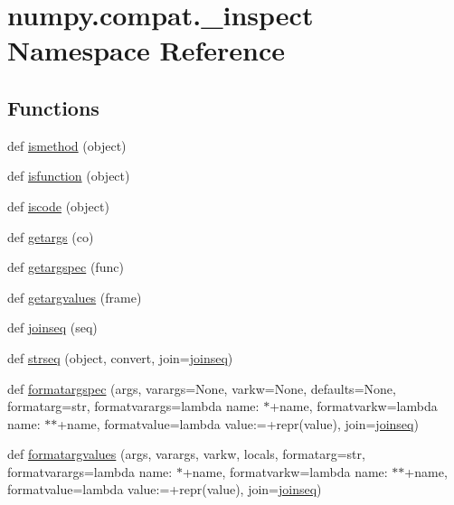 \hypertarget{namespacenumpy_1_1compat_1_1__inspect}{}\section{numpy.\+compat.\+\_\+inspect Namespace Reference}
\label{namespacenumpy_1_1compat_1_1__inspect}
\subsection*{Functions}
\begin{DoxyCompactItemize}
\item 
def \hyperlink{namespacenumpy_1_1compat_1_1__inspect_ae59647a7593534301b0ce285e6d7eaf6}{ismethod} (object)
\item 
def \hyperlink{namespacenumpy_1_1compat_1_1__inspect_a669c0eb73402e8093553b02da2044fed}{isfunction} (object)
\item 
def \hyperlink{namespacenumpy_1_1compat_1_1__inspect_a71a2fe78ad81c44cd5ecafd51045568c}{iscode} (object)
\item 
def \hyperlink{namespacenumpy_1_1compat_1_1__inspect_a23817c2f9b36917251659f54ae73dd93}{getargs} (co)
\item 
def \hyperlink{namespacenumpy_1_1compat_1_1__inspect_a15898a9bd81ac934993fdb5799f07f0b}{getargspec} (func)
\item 
def \hyperlink{namespacenumpy_1_1compat_1_1__inspect_a9a4cbd507be7b8c8d5f12d4d21a9defb}{getargvalues} (frame)
\item 
def \hyperlink{namespacenumpy_1_1compat_1_1__inspect_ab1438af7fbbffb0fd2b5a564cdd7eef8}{joinseq} (seq)
\item 
def \hyperlink{namespacenumpy_1_1compat_1_1__inspect_a7313bf47b85e2438ff6882685a66ae5f}{strseq} (object, convert, join=\hyperlink{namespacenumpy_1_1compat_1_1__inspect_ab1438af7fbbffb0fd2b5a564cdd7eef8}{joinseq})
\item 
def \hyperlink{namespacenumpy_1_1compat_1_1__inspect_a67dec5118cf81371090560691d8f4fc4}{formatargspec} (args, varargs=None, varkw=None, defaults=None, formatarg=str, formatvarargs=lambda name\+:\textquotesingle{} $\ast$\textquotesingle{}+name, formatvarkw=lambda name\+:\textquotesingle{} $\ast$$\ast$\textquotesingle{}+name, formatvalue=lambda value\+:\textquotesingle{}=\textquotesingle{}+repr(value), join=\hyperlink{namespacenumpy_1_1compat_1_1__inspect_ab1438af7fbbffb0fd2b5a564cdd7eef8}{joinseq})
\item 
def \hyperlink{namespacenumpy_1_1compat_1_1__inspect_af63fc3a833eff7c78a4b80b071c5cd2b}{formatargvalues} (args, varargs, varkw, locals, formatarg=str, formatvarargs=lambda name\+:\textquotesingle{} $\ast$\textquotesingle{}+name, formatvarkw=lambda name\+:\textquotesingle{} $\ast$$\ast$\textquotesingle{}+name, formatvalue=lambda value\+:\textquotesingle{}=\textquotesingle{}+repr(value), join=\hyperlink{namespacenumpy_1_1compat_1_1__inspect_ab1438af7fbbffb0fd2b5a564cdd7eef8}{joinseq})
\end{DoxyCompactItemize}


